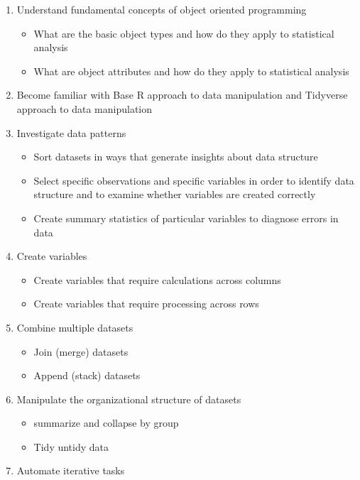 \documentclass[11pt,]{article}
\providecommand{\tightlist}{%
  \setlength{\itemsep}{0pt}\setlength{\parskip}{0pt}}
\begin{document}
\begin{enumerate}
\def\labelenumi{\arabic{enumi}.}
\tightlist
\item
  Understand fundamental concepts of object oriented programming

  \begin{itemize}
  \tightlist
  \item
    What are the basic object types and how do they apply to statistical
    analysis
  \item
    What are object attributes and how do they apply to statistical
    analysis
  \end{itemize}
\item
  Become familiar with Base R approach to data manipulation and
  Tidyverse approach to data manipulation
\item
  Investigate data patterns

  \begin{itemize}
  \tightlist
  \item
    Sort datasets in ways that generate insights about data structure
  \item
    Select specific observations and specific variables in order to
    identify data structure and to examine whether variables are created
    correctly
  \item
    Create summary statistics of particular variables to diagnose errors
    in data
  \end{itemize}
\item
  Create variables

  \begin{itemize}
  \tightlist
  \item
    Create variables that require calculations across columns
  \item
    Create variables that require processing across rows
  \end{itemize}
\item
  Combine multiple datasets

  \begin{itemize}
  \tightlist
  \item
    Join (merge) datasets
  \item
    Append (stack) datasets
  \end{itemize}
\item
  Manipulate the organizational structure of datasets

  \begin{itemize}
  \tightlist
  \item
    summarize and collapse by group
  \item
    Tidy untidy data
  \end{itemize}
\item
  Automate iterative tasks


\end{enumerate}
\end{document}
